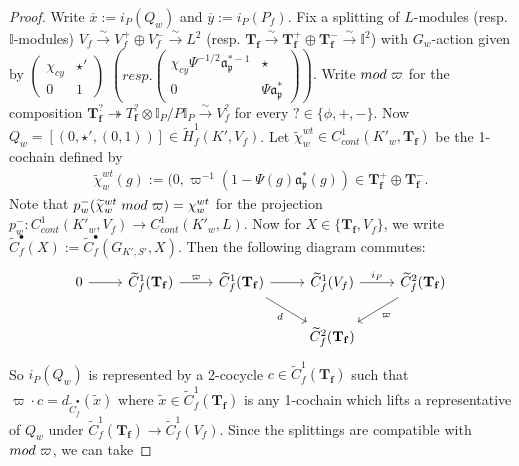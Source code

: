 \documentclass[reqno,10pt]{amsart}
\newcommand{\I}{\mathbb{I}}
\newcommand{\f}{\mathbf{f}}
\newcommand{\T}{\mathbf{T}}
\newcommand{\ma}{\mathfrak{a}}
\newcommand{\p}{\mathfrak{p}}
\newcommand{\vp}{\varpi}
\newcommand{\ox}{\overline{x}}
\newcommand{\oy}{\overline{y}}
\newcommand{\wx}{\widetilde{x}}
\theoremstyle{plain}
\theoremstyle{definition}
\begin{document}
\begin{proof}
    Write $\ox := i_P(Q_w)$ and $\oy := i_P(P_f)$. Fix a splitting of $L$-modules (resp. $\I$-modules) $V_f \xrightarrow{\sim} V_f^+ \oplus V_f^- \xrightarrow{\sim} L^2$ (resp. $\T_\f \xrightarrow{\sim} \T_\f^+ \oplus \T_\f^- \xrightarrow{\sim} \I^2$) with $G_w$-action given by
    $\begin{pmatrix}
        \chi_{cy} & \star' \\ 0 & 1
    \end{pmatrix}$
    $\left(resp. 
    \begin{pmatrix}
        \chi_{cy} \Psi^{-1/2} \ma_\p^{*-1} & \star \\ 0 & \Psi \ma_\p^*
    \end{pmatrix}
    \right)$.
    Write $mod \hspace{1mm} \vp$ for the composition $\T_\f^? \twoheadrightarrow T_\f^? \otimes \I_P/P\I_P \xrightarrow{\sim} V_f^?$ for every $? \in \{\phi,+,-\}$. Now $Q_w = [(0,\star',(0,1))] \in \widetilde{H}^1_f(K',V_f)$. Let $\widetilde{\chi}_w^{wt} \in C^1_{cont}(K'_w,\T_\f)$ be the 1-cochain defined by
    \begin{align*}
        \widetilde{\chi}_w^{wt}(g) := (0, \vp^{-1}(1-\Psi(g)\ma_\p^*(g)) \in \T_\f^+ \oplus \T_\f^-.
    \end{align*}
      Note that $p_w^-(\widetilde{\chi}_w^{wt} \hspace{1mm} mod \hspace{1mm} \vp) = \chi_w^{wt}$ for the projection $p_w^- : C^1_{cont}(K'_w,V_f) \rightarrow C^1_{cont}(K'_w,L)$. Now for $X \in \{\T_\f, V_f\}$, we write $\widetilde{C}^\bullet_f(X) := \widetilde{C}^\bullet_f(G_{K',S'},X)$. Then the following diagram commutes: 
    \begin{equation}
\begin{tikzcd}
    0 \arrow[r] & \widetilde{C}^1_f(\T_\f) \arrow[r,"\vp"] & \widetilde{C}^1_f(\T_\f) \arrow[r] \arrow[dr, "d"'] & \widetilde{C}^1_f(V_f) \arrow[r, "i_P"] & \widetilde{C}^2_f(\T_\f) \arrow[dl, "\vp"] \\
    & & & \widetilde{C}^2_f(\T_\f) 
\end{tikzcd}
\end{equation}
So $i_P(Q_w)$ is represented by a 2-cocycle $c \in \widetilde{C}^1_f(\T_\f)$ such that $\vp \cdot c = d_{\widetilde{C}^\bullet_f}(\wx)$ where $\wx \in \widetilde{C}^1_f(\T_\f)$ is any 1-cochain which lifts a representative of $Q_w$ under $\widetilde{C}^1_f(\T_\f) \rightarrow \widetilde{C}^1_f(V_f)$. Since the splittings are compatible with $mod \hspace{1mm} \vp$, we can take

\end{proof}
\end{document}
